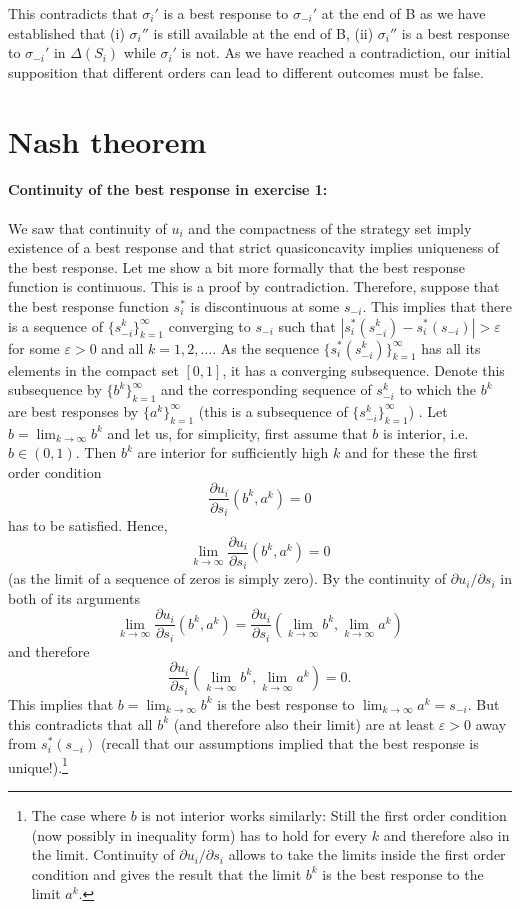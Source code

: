 \documentclass[a4paper,11pt]{article}
\begin{document}
This contradicts that $\sigma_i'$ is a best response to $\sigma_{-i}'$ at the end of B as we have established that (i) $\sigma_i''$ is still available at the end of B, (ii) $\sigma_i''$ is a best response to $\sigma_{-i}'$ in $\Delta(S_i)$ while $\sigma_i'$ is not. As we have reached a contradiction, our initial supposition that different orders can lead to different outcomes must be false.


\section{Nash theorem}
\label{sec:nash-theorem}

\paragraph{Continuity of the best response in exercise 1:} We saw that continuity of $u_i$ and the compactness of the strategy set imply existence of a best response and that strict quasiconcavity implies uniqueness of the best response. Let me show a bit more formally that the best response function is continuous. This is a proof by contradiction. Therefore, suppose that the best response function $s_i^*$ is discontinuous at some $s_{-i}$. This implies that there is a sequence of $\{s_{-i}^k\}_{k=1}^\infty$ converging to $s_{-i}$ such that $|s_{i}^*(s_{-i}^k)-s_i^*(s_{-i})|>\varepsilon $ for some $\varepsilon >0$ and all $k=1,2,\dots$. As the sequence $\{s_i^*(s_{-i}^k)\}_{k=1}^{\infty}$ has all its elements in the compact set $[0,1]$, it has a converging subsequence. Denote this subsequence by $\{ b^k\}_{k=1}^\infty$ and the corresponding sequence of $s_{-i}^k$ to which the $b^k$ are best responses by $\{a^k\}_{k=1}^\infty$ (this is a subsequence of  $\{s_{-i}^k\}_{k=1}^\infty$) . Let $b=\lim_{k\rightarrow\infty}b^k$ and let us, for simplicity, first assume that $b$ is interior, i.e. $b\in(0,1)$. Then $b^k$ are interior for sufficiently high $k$ and for these the first order condition
$$\frac{\partial u_i}{\partial s_i }(b^k,a^k)=0$$
has to be satisfied. Hence,
$$\lim_{k\rightarrow\infty}\frac{\partial u_i}{\partial s_i }(b^k,a^k)=0$$
(as the limit of a sequence of zeros is simply zero).
By the continuity of $\partial u_i/\partial s_i$ in both of its arguments
$$\lim_{k\rightarrow\infty}\frac{\partial u_i}{\partial s_i }(b^k,a^k)=\frac{\partial u_i}{\partial s_i }(\lim_{k\rightarrow\infty}b^k,\lim_{k\rightarrow\infty}a^k)$$
and therefore
$$\frac{\partial u_i}{\partial s_i }(\lim_{k\rightarrow\infty}b^k,\lim_{k\rightarrow\infty}a^k)=0.$$
This implies that $b=\lim_{k\rightarrow\infty}b^k$ is the best response to $\lim_{k\rightarrow\infty}a^k=s_{-i}$. But this contradicts that all $b^k$ (and therefore also their limit) are at least $\varepsilon>0 $ away from $s_i^*(s_{-i})$ (recall that our assumptions implied that the best response is unique!).\footnote{The case where $b$ is not interior works similarly: Still the first order condition (now possibly in inequality form) has to hold for every $k$ and therefore also in the limit. Continuity of $\partial u_i/\partial s_i$ allows to take the limits inside the first order condition and gives the result that the limit $b^k$ is the best response to the limit $a^k$.}
\end{document}
